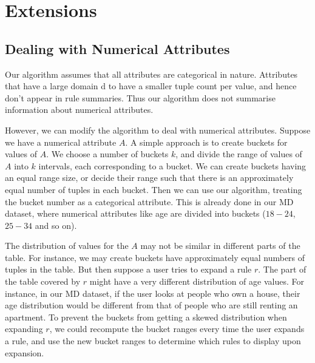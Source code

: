 \documentclass{sig-alternate}
\begin{document}
\begin{comment}
Notes based on Explanation Tables paper: Prove that our problem is NP-Hard to solve exactly. Something like the Set Cover Problem. Yes, that is easy. 

The way we deal with overlap, is that the key differentiating factor?

We don't have the binary thing. Is it useful? Maybe we can summarize better without it. We are solving a different problem, optimising for coverage rather than explaining the binary attribute. They are optimising for KL divergence of max entropy distribution. They mention many other papers that optimize for cardinality or similar. We do weight times cardinality, which is a compromise between descriptiveness and coverage, and allow user to change the weight function. But should check those papers out anyway. 

\end{comment}

\section{Extensions}
\subsection{Dealing with Numerical Attributes}
Our algorithm assumes that all attributes are categorical in nature. Attributes that have a large domain d to have a smaller tuple count per value, and hence don't appear in rule summaries. Thus our algorithm does not summarise information about numerical attributes. 

However, we can modify the algorithm to deal with numerical attributes. Suppose we have a numerical attribute $A$. A simple approach is to create buckets for values of $A$. We choose a number of buckets $k$, and divide the range of values of $A$ into $k$ intervals, each corresponding to a bucket. We can create buckets having an equal range size, or decide their range such that there is an approximately equal number of tuples in each bucket. Then we can use our algorithm, treating the bucket number as a categorical attribute. This is already done in our MD dataset, where numerical attributes like age are divided into buckets ($18-24$, $25-34$ and so on).

The distribution of values for the $A$ may not be similar in different parts of the table. For instance, we may create buckets have approximately equal numbers of tuples in the table. But then suppose a user tries to expand a rule $r$. The part of the table covered by $r$ might have a very different distribution of age values. For instance, in our MD dataset, if the user looks at people who own a house, their age distribution would be different from that of people who are still renting an apartment. To prevent the buckets from getting a skewed distribution when expanding $r$, we could recompute the bucket ranges every time the user expands a rule, and use the new bucket ranges to determine which rules to display upon expansion. 
\end{document}
